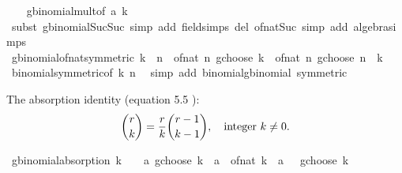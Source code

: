 \begin{isabellebody}
%
\isadelimproof
\ \ %
\endisadelimproof
%
\isatagproof
{}\isamarkupfalse%
\ gbinomial{\isacharunderscore}{\kern0pt}mult{\isacharunderscore}{\kern0pt}{}{\isacharbrackleft}{\kern0pt}of\ a\ k{\isacharbrackright}{\kern0pt}\isanewline
\ \ \isamarkupfalse%
\ {\isacharparenleft}{\kern0pt}subst\ gbinomial{\isacharunderscore}{\kern0pt}Suc{\isacharunderscore}{\kern0pt}Suc{\isacharparenright}{\kern0pt}\ {\isacharparenleft}{\kern0pt}simp\ add{\isacharcolon}{\kern0pt}\ field{\isacharunderscore}{\kern0pt}simps\ del{\isacharcolon}{\kern0pt}\ of{\isacharunderscore}{\kern0pt}nat{\isacharunderscore}{\kern0pt}Suc{\isacharcomma}{\kern0pt}\ simp\ add{\isacharcolon}{\kern0pt}\ algebra{\isacharunderscore}{\kern0pt}simps{\isacharparenright}{\kern0pt}%
\endisatagproof
{\isafoldproof}%
%
\isadelimproof
\isanewline
%
\endisadelimproof
\isanewline
{}\isamarkupfalse%
\ gbinomial{\isacharunderscore}{\kern0pt}of{\isacharunderscore}{\kern0pt}nat{\isacharunderscore}{\kern0pt}symmetric{\isacharcolon}{\kern0pt}\ {\isachardoublequoteopen}k\ {\isasymle}\ n\ {\isasymLongrightarrow}\ {\isacharparenleft}{\kern0pt}of{\isacharunderscore}{\kern0pt}nat\ n{\isacharparenright}{\kern0pt}\ gchoose\ k\ {\isacharequal}{\kern0pt}\ {\isacharparenleft}{\kern0pt}of{\isacharunderscore}{\kern0pt}nat\ n{\isacharparenright}{\kern0pt}\ gchoose\ {\isacharparenleft}{\kern0pt}n\ {\isacharminus}{\kern0pt}\ k{\isacharparenright}{\kern0pt}{\isachardoublequoteclose}\isanewline
%
\isadelimproof
\ \ %
\endisadelimproof
%
\isatagproof
{}\isamarkupfalse%
\ binomial{\isacharunderscore}{\kern0pt}symmetric{\isacharbrackleft}{\kern0pt}of\ k\ n{\isacharbrackright}{\kern0pt}\ \isamarkupfalse%
\ {\isacharparenleft}{\kern0pt}simp\ add{\isacharcolon}{\kern0pt}\ binomial{\isacharunderscore}{\kern0pt}gbinomial\ {\isacharbrackleft}{\kern0pt}symmetric{\isacharbrackright}{\kern0pt}{\isacharparenright}{\kern0pt}%
\endisatagproof
{\isafoldproof}%
%
\isadelimproof
%
\endisadelimproof
%
\begin{isamarkuptext}%
The absorption identity (equation 5.5 \cite[p.~157]{GKP_CM}):
\[
{r \choose k} = \frac{r}{k}{r - 1 \choose k - 1},\quad \textnormal{integer } k \neq 0.
\]%
\end{isamarkuptext}\isamarkuptrue%
\isamarkupfalse%
\ gbinomial{\isacharunderscore}{\kern0pt}absorption{\isacharprime}{\kern0pt}{\isacharcolon}{\kern0pt}\ {\isachardoublequoteopen}k\ {\isachargreater}{\kern0pt}\ {}\ {\isasymLongrightarrow}\ a\ gchoose\ k\ {\isacharequal}{\kern0pt}\ {\isacharparenleft}{\kern0pt}a\ {\isacharslash}{\kern0pt}\ of{\isacharunderscore}{\kern0pt}nat\ k{\isacharparenright}{\kern0pt}\ {\isacharasterisk}{\kern0pt}\ {\isacharparenleft}{\kern0pt}a\ {\isacharminus}{\kern0pt}\ {}\ gchoose\ {\isacharparenleft}{\kern0pt}k\ {\isacharminus}{\kern0pt}\ {}{\isacharparenright}{\kern0pt}{\isacharparenright}{\kern0pt}{\isachardoublequoteclose}\isanewline

\end{isabellebody}

